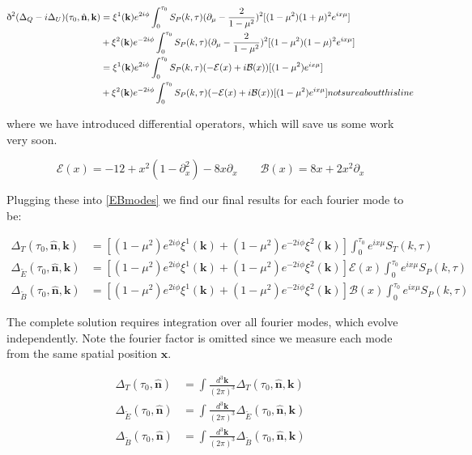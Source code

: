 \documentclass[a4paper,10pt]{article}
\renewcommand{\v}[1]{\mathbf{#1}}
\newcommand{\fint}[1]{\int \frac{d^3 \v{#1}}{(2\pi)^3}}
\newcommand{\unit}[1]{\hat{\v{#1}}}
\newcommand{\sr}{\text{\normalfont\dh}}
\begin{document}
\begin{equation}\begin{split}
\sr^2(\Delta_Q-i\Delta_U)(\tau_0,\unit{n},\v{k}) &= \xi^1(\v{k})e^{2i\phi}\int_0^{\tau_0}S_P(k,\tau)(\partial_\mu-\frac{2}{1-\mu^2})^2[(1-\mu^2)(1+\mu)^2 e^{ix\mu}] \\ 
&{} + \xi^2(\v{k})e^{-2i\phi}\int_0^{\tau_0}S_P(k,\tau)(\partial_\mu-\frac{2}{1-\mu^2})^2[(1-\mu^2)(1-\mu)^2 e^{ix\mu}]\\
&= \xi^1(\v{k})e^{2i\phi}\int_0^{\tau_0}S_P(k,\tau)(-\mathcal{E}(x)+i\mathcal{B}(x))[(1-\mu^2) e^{ix\mu}] \\
&{} + \xi^2(\v{k})e^{-2i\phi}\int_0^{\tau_0}S_P(k,\tau)(-\mathcal{E}(x)+i\mathcal{B}(x))[(1-\mu^2) e^{ix\mu}] not sure about this line
\end{split}\end{equation}

where we have introduced differential operators, which will save us some work very soon.

\begin{equation}
\mathcal{E}(x)=-12+x^2(1-\partial^2_x)-8x\partial_x \qquad \mathcal{B}(x) = 8x+2x^2\partial_x
\end{equation}

Plugging these into \ref{EBmodes} we find our final results for each fourier mode to be:

\begin{equation}\begin{split}
\Delta_T(\tau_0,\unit{n},\v{k}) &= [(1-\mu^2) e^{2i\phi} \xi^1(\v{k})+(1-\mu^2) e^{-2i\phi} \xi^2(\v{k})]\int_0^{\tau_0} e^{ix\mu}S_T(k,\tau)\\
\Delta_{\tilde{E}}(\tau_0,\unit{n},\v{k}) &= [(1-\mu^2) e^{2i\phi} \xi^1(\v{k})+(1-\mu^2) e^{-2i\phi} \xi^2(\v{k})]\mathcal{E}(x)\int_0^{\tau_0} e^{ix\mu}S_P(k,\tau)\\
\Delta_{\tilde{B}}(\tau_0,\unit{n},\v{k}) &= [(1-\mu^2) e^{2i\phi} \xi^1(\v{k})+(1-\mu^2) e^{-2i\phi} \xi^2(\v{k})]\mathcal{B}(x)\int_0^{\tau_0} e^{ix\mu}S_P(k,\tau)
\label{LoSfourier}
\end{split}\end{equation}

The complete solution requires integration over all fourier modes, which evolve independently. Note the fourier factor is omitted since we measure each mode from the same spatial position $\v{x}$.

\begin{equation}\begin{split}
\Delta_T(\tau_0,\unit{n}) &= \fint{k} \Delta_T(\tau_0,\unit{n},\v{k})\\
\Delta_{\tilde{E}}(\tau_0,\unit{n}) &= \fint{k}\Delta_{\tilde{E}}(\tau_0,\unit{n},\v{k})\\
\Delta_{\tilde{B}}(\tau_0,\unit{n}) &= \fint{k}\Delta_{\tilde{B}}(\tau_0,\unit{n},\v{k})
\end{split}\end{equation}
\end{document}
